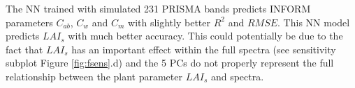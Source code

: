 \documentclass[a4paper, twoside]{templates/ociamthesis}
\begin{document}
The NN trained with simulated 231 PRISMA bands predicts INFORM parameters \(C_{ab}\), \(C_{w}\) and \(C_{m}\) with slightly better \(R^{2}\) and \(RMSE\). This NN model predicts \(LAI_{s}\) with much better accuracy. This could potentially be due to the fact that \(LAI_{s}\) has an important effect within the full spectra (see sensitivity subplot Figure \ref{fig:fsens}.d) and the 5 PCs do not properly represent the full relationship between the plant parameter \(LAI_{s}\) and spectra.






\end{document}
